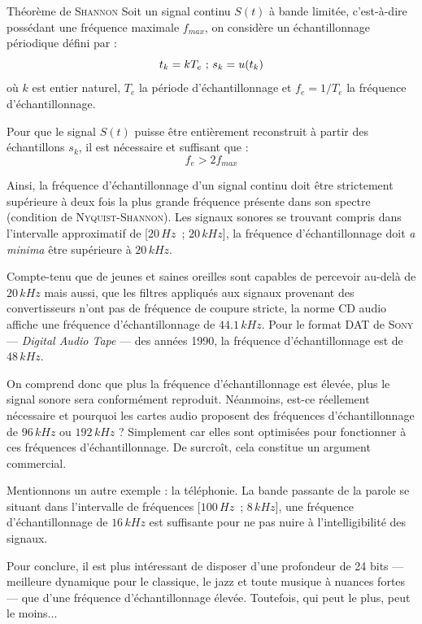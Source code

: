\begin{tcbcontents}{Théorème de \textsc{Shannon}}
Soit un signal continu $S(t)$ à bande limitée, c'est-à-dire possédant une fréquence maximale $f_{max}$, on considère un échantillonnage périodique défini par :
\[
t_k = k T_e \mbox{~;~} s_k = u(t_k)
\vspace{4pt}
\]
où $k$ est entier naturel, $T_{e}$ la période d’échantillonnage et $f_{e} = 1/T_{e}$ la fréquence d'échantillonnage.

Pour que le signal $S(t)$ puisse être entièrement reconstruit à partir des échantillons $s_k$, il est nécessaire et suffisant que :
\begin{equation}
f_e > 2 f_{max}
\end{equation}
\end{tcbcontents}

%
Ainsi, la fréquence d'échantillonnage d'un signal continu doit être strictement supérieure à deux fois la plus grande fréquence présente dans son spectre (condition de \textsc{Nyquist}-\textsc{Shannon}).
Les signaux sonores se trouvant compris dans l'intervalle approximatif de [$20\,Hz$~; $20\,kHz$], la fréquence d'échantillonnage doit \textit{a minima} être supérieure à $20\,kHz$. 

Compte-tenu que de jeunes et saines oreilles sont capables de percevoir au-delà de $20\,kHz$ mais aussi, que les filtres appliqués aux signaux provenant des convertisseurs n'ont pas de fréquence de coupure stricte, la norme CD audio affiche une fréquence d'échantillonnage de $\num{44.1}\,kHz$. Pour le format DAT de \textsc{Sony} --- \textit{Digital Audio Tape} --- des années 1990, la fréquence d'échantillonnage est de $48\,kHz$.

On comprend donc que plus la fréquence d'échantillonnage est élevée, plus le signal sonore sera conformément reproduit. Néanmoins, est-ce réellement nécessaire et pourquoi les cartes audio proposent des fréquences d'échantillonnage de $96\,kHz$ ou $192\,kHz$ ? Simplement car elles sont optimisées pour fonctionner à ces fréquences d'échantillonnage. De surcroît, cela constitue un argument commercial.

Mentionnons un autre exemple : la téléphonie. La bande passante de la parole se situant dans l'intervalle de fréquences [$100\,Hz$~; $8\,kHz$], une fréquence d’échantillonnage de $16\,kHz$ est suffisante pour ne pas nuire à l'intelligibilité des signaux.

Pour conclure, il est plus intéressant de disposer d'une profondeur de 24 bits --- meilleure dynamique pour le classique, le jazz et toute musique à nuances fortes --- que d'une fréquence d'échantillonnage élevée. Toutefois, qui peut le plus, peut le moins...


